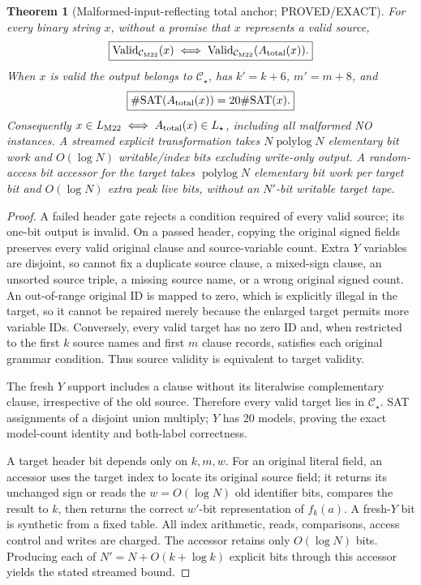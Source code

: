 \documentclass[11pt]{article}
\newtheorem{theorem}{Theorem}
\newcommand{\CM}{\mathcal C_{\mathrm{M22}}}
\newcommand{\CS}{\mathcal C_\star}
\begin{document}
\begin{theorem}[Malformed-input-reflecting total anchor; PROVED/EXACT]
For every binary string $x$, without a promise that $x$ represents a valid source,
\[
\boxed{\operatorname{Valid}_{\CM}(x)\iff\operatorname{Valid}_{\CM}(A_{\rm total}(x)).}
\]
When $x$ is valid the output belongs to $\CS$, has $k'=k+6$, $m'=m+8$, and
\[
\boxed{\#\mathrm{SAT}(A_{\rm total}(x))=20\#\mathrm{SAT}(x).}
\]
Consequently $x\in L_{\mathrm{M22}}\iff A_{\rm total}(x)\in L_\star$, including all malformed NO instances. A streamed explicit transformation takes $N\operatorname{polylog}N$ elementary bit work and $O(\log N)$ writable/index bits excluding write-only output. A random-access bit accessor for the target takes $\operatorname{polylog}N$ elementary bit work per target bit and $O(\log N)$ extra peak live bits, without an $N'$-bit writable target tape.
\end{theorem}
\begin{proof}
A failed header gate rejects a condition required of every valid source; its one-bit output is invalid. On a passed header, copying the original signed fields preserves every valid original clause and source-variable count. Extra $Y$ variables are disjoint, so cannot fix a duplicate source clause, a mixed-sign clause, an unsorted source triple, a missing source name, or a wrong original signed count. An out-of-range original ID is mapped to zero, which is explicitly illegal in the target, so it cannot be repaired merely because the enlarged target permits more variable IDs. Conversely, every valid target has no zero ID and, when restricted to the first $k$ source names and first $m$ clause records, satisfies each original grammar condition. Thus source validity is equivalent to target validity.

The fresh $Y$ support includes a clause without its literalwise complementary clause, irrespective of the old source. Therefore every valid target lies in $\CS$. SAT assignments of a disjoint union multiply; $Y$ has 20 models, proving the exact model-count identity and both-label correctness.

A target header bit depends only on $k,m,w$. For an original literal field, an accessor uses the target index to locate its original source field; it returns its unchanged sign or reads the $w=O(\log N)$ old identifier bits, compares the result to $k$, then returns the correct $w'$-bit representation of $f_k(a)$. A fresh-$Y$ bit is synthetic from a fixed table. All index arithmetic, reads, comparisons, access control and writes are charged. The accessor retains only $O(\log N)$ bits. Producing each of $N'=N+O(k+\log k)$ explicit bits through this accessor yields the stated streamed bound.
\end{proof}
\end{document}
